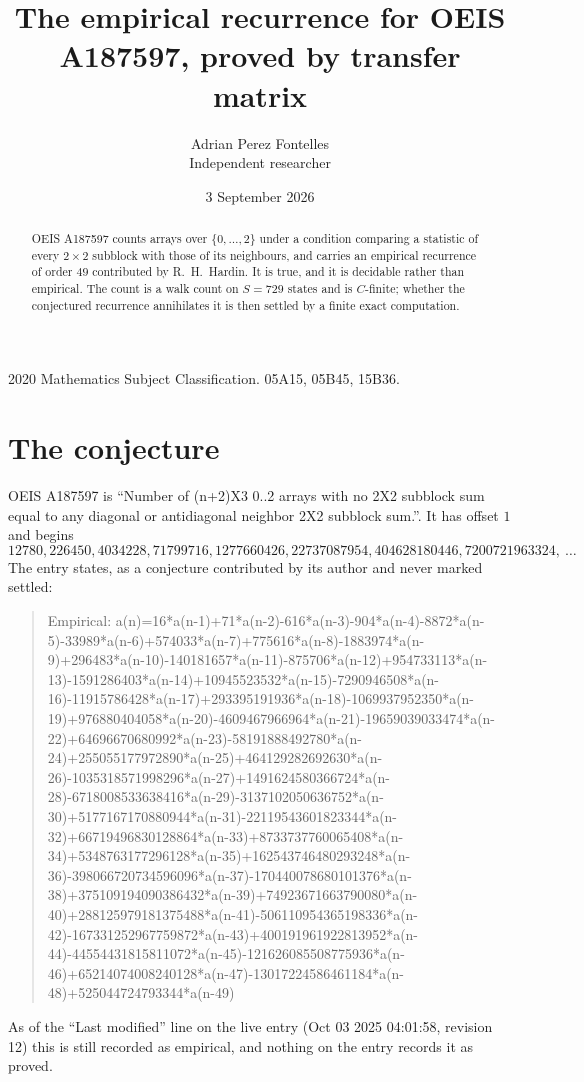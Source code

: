 \documentclass[11pt,a4paper]{article}
\title{The empirical recurrence for OEIS A187597, proved by transfer matrix}
\author{Adrian Perez Fontelles\\ \small Independent researcher}
\date{3 September 2026}
\theoremstyle{plain}
\theoremstyle{definition}
\begin{document}
\maketitle

\begin{abstract}
OEIS A187597 counts arrays over $\{0,\dots,2\}$ under a condition comparing a statistic of
every $2\times2$ subblock with those of its neighbours, and carries an empirical recurrence
of order $49$ contributed by R.~H.~Hardin. It is true, and it is decidable rather than
empirical. The count is a walk count on $S=729$ states and is $C$-finite; whether the
conjectured recurrence annihilates it is then settled by a finite exact computation.
\end{abstract}

\noindent\small 2020 Mathematics Subject Classification. 05A15, 05B45, 15B36.\normalsize

\section{The conjecture}

OEIS A187597 is ``Number of (n+2)X3 0..2 arrays with no 2X2 subblock sum equal to any diagonal or antidiagonal neighbor 2X2 subblock sum.''. It has offset $1$ and begins
\[
12780, 226450, 4034228, 71799716, 1277660426, 22737087954, 404628180446, 7200721963324,\ \dots
\]
The entry states, as a conjecture contributed by its author and never marked settled:
\begin{quote}
Empirical: a(n)=16*a(n-1)+71*a(n-2)-616*a(n-3)-904*a(n-4)-8872*a(n-5)-33989*a(n-6)+574033*a(n-7)+775616*a(n-8)-1883974*a(n-9)+296483*a(n-10)-140181657*a(n-11)-875706*a(n-12)+954733113*a(n-13)-1591286403*a(n-14)+10945523532*a(n-15)-7290946508*a(n-16)-11915786428*a(n-17)+293395191936*a(n-18)-1069937952350*a(n-19)+976880404058*a(n-20)-4609467966964*a(n-21)-19659039033474*a(n-22)+64696670680992*a(n-23)-58191888492780*a(n-24)+255055177972890*a(n-25)+464129282692630*a(n-26)-1035318571998296*a(n-27)+1491624580366724*a(n-28)-6718008533638416*a(n-29)-3137102050636752*a(n-30)+5177167170880944*a(n-31)-22119543601823344*a(n-32)+66719496830128864*a(n-33)+8733737760065408*a(n-34)+5348763177296128*a(n-35)+162543746480293248*a(n-36)-398066720734596096*a(n-37)-170440078680101376*a(n-38)+375109194090386432*a(n-39)+74923671663790080*a(n-40)+288125979181375488*a(n-41)-506110954365198336*a(n-42)-167331252967759872*a(n-43)+400191961922813952*a(n-44)-44554431815811072*a(n-45)-121626085508775936*a(n-46)+65214074008240128*a(n-47)-13017224586461184*a(n-48)+525044724793344*a(n-49)
\end{quote}
As of the ``Last modified'' line on the live entry (Oct 03 2025 04:01:58, revision 12) this is still
recorded as empirical, and nothing on the entry records it as proved.
\end{document}
